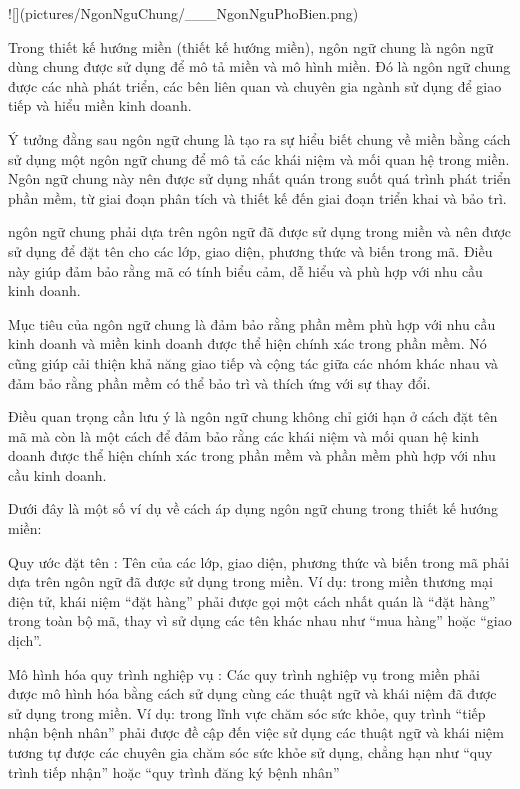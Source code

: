 
![](pictures/NgonNguChung/___NgonNguPhoBien.png)



Trong thiết kế hướng miền (thiết kế hướng miền), ngôn ngữ chung là ngôn ngữ dùng chung được sử dụng để mô tả miền và mô hình miền. Đó là ngôn ngữ chung được các nhà phát triển, các bên liên quan và chuyên gia ngành sử dụng để giao tiếp và hiểu miền kinh doanh.

Ý tưởng đằng sau ngôn ngữ chung là tạo ra sự hiểu biết chung về miền bằng cách sử dụng một ngôn ngữ chung để mô tả các khái niệm và mối quan hệ trong miền. Ngôn ngữ chung này nên được sử dụng nhất quán trong suốt quá trình phát triển phần mềm, từ giai đoạn phân tích và thiết kế đến giai đoạn triển khai và bảo trì.

ngôn ngữ chung phải dựa trên ngôn ngữ đã được sử dụng trong miền và nên được sử dụng để đặt tên cho các lớp, giao diện, phương thức và biến trong mã. Điều này giúp đảm bảo rằng mã có tính biểu cảm, dễ hiểu và phù hợp với nhu cầu kinh doanh.

Mục tiêu của ngôn ngữ chung là đảm bảo rằng phần mềm phù hợp với nhu cầu kinh doanh và miền kinh doanh được thể hiện chính xác trong phần mềm. Nó cũng giúp cải thiện khả năng giao tiếp và cộng tác giữa các nhóm khác nhau và đảm bảo rằng phần mềm có thể bảo trì và thích ứng với sự thay đổi.

Điều quan trọng cần lưu ý là ngôn ngữ chung không chỉ giới hạn ở cách đặt tên mã mà còn là một cách để đảm bảo rằng các khái niệm và mối quan hệ kinh doanh được thể hiện chính xác trong phần mềm và phần mềm phù hợp với nhu cầu kinh doanh.

Dưới đây là một số ví dụ về cách áp dụng ngôn ngữ chung trong thiết kế hướng miền:

Quy ước đặt tên : Tên của các lớp, giao diện, phương thức và biến trong mã phải dựa trên ngôn ngữ đã được sử dụng trong miền. Ví dụ: trong miền thương mại điện tử, khái niệm “đặt hàng” phải được gọi một cách nhất quán là “đặt hàng” trong toàn bộ mã, thay vì sử dụng các tên khác nhau như “mua hàng” hoặc “giao dịch”.

Mô hình hóa quy trình nghiệp vụ : Các quy trình nghiệp vụ trong miền phải được mô hình hóa bằng cách sử dụng cùng các thuật ngữ và khái niệm đã được sử dụng trong miền. Ví dụ: trong lĩnh vực chăm sóc sức khỏe, quy trình “tiếp nhận bệnh nhân” phải được đề cập đến việc sử dụng các thuật ngữ và khái niệm tương tự được các chuyên gia chăm sóc sức khỏe sử dụng, chẳng hạn như “quy trình tiếp nhận” hoặc “quy trình đăng ký bệnh nhân”

